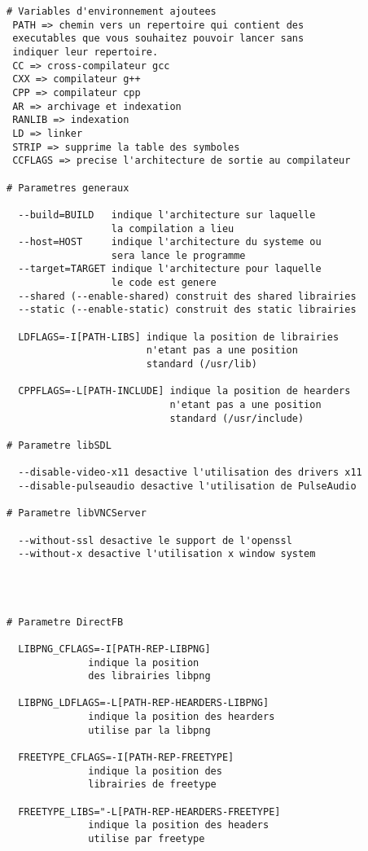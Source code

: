 \begin{lstlisting}
# Variables d'environnement ajoutees
 PATH => chemin vers un repertoire qui contient des
 executables que vous souhaitez pouvoir lancer sans
 indiquer leur repertoire.
 CC => cross-compilateur gcc
 CXX => compilateur g++
 CPP => compilateur cpp
 AR => archivage et indexation
 RANLIB => indexation
 LD => linker
 STRIP => supprime la table des symboles
 CCFLAGS => precise l'architecture de sortie au compilateur

# Parametres generaux
  
  --build=BUILD   indique l'architecture sur laquelle
                  la compilation a lieu
  --host=HOST     indique l'architecture du systeme ou
                  sera lance le programme   
  --target=TARGET indique l'architecture pour laquelle
                  le code est genere
  --shared (--enable-shared) construit des shared librairies
  --static (--enable-static) construit des static librairies
 
  LDFLAGS=-I[PATH-LIBS] indique la position de librairies
                        n'etant pas a une position
                        standard (/usr/lib)
  
  CPPFLAGS=-L[PATH-INCLUDE] indique la position de hearders
                            n'etant pas a une position
                            standard (/usr/include)
  
# Parametre libSDL

  --disable-video-x11 desactive l'utilisation des drivers x11 
  --disable-pulseaudio desactive l'utilisation de PulseAudio
  
# Parametre libVNCServer  

  --without-ssl desactive le support de l'openssl
  --without-x desactive l'utilisation x window system
  
  
  
  
# Parametre DirectFB 

  LIBPNG_CFLAGS=-I[PATH-REP-LIBPNG]
              indique la position
              des librairies libpng
  
  LIBPNG_LDFLAGS=-L[PATH-REP-HEARDERS-LIBPNG] 
              indique la position des hearders 
              utilise par la libpng
  
  FREETYPE_CFLAGS=-I[PATH-REP-FREETYPE]
              indique la position des
              librairies de freetype
 
  FREETYPE_LIBS="-L[PATH-REP-HEARDERS-FREETYPE] 
              indique la position des headers
              utilise par freetype
 

\end{lstlisting}
